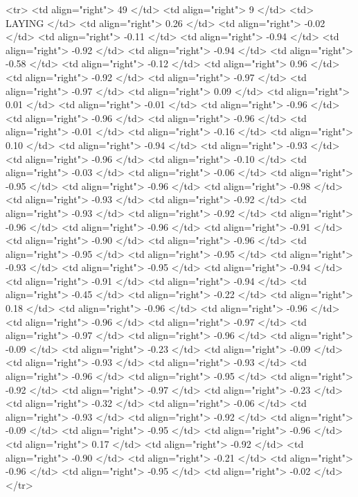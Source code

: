   <tr> <td align="right"> 49 </td> <td align="right">   9 </td> <td> LAYING </td> <td align="right"> 0.26 </td> <td align="right"> -0.02 </td> <td align="right"> -0.11 </td> <td align="right"> -0.94 </td> <td align="right"> -0.92 </td> <td align="right"> -0.94 </td> <td align="right"> -0.58 </td> <td align="right"> -0.12 </td> <td align="right"> 0.96 </td> <td align="right"> -0.92 </td> <td align="right"> -0.97 </td> <td align="right"> -0.97 </td> <td align="right"> 0.09 </td> <td align="right"> 0.01 </td> <td align="right"> -0.01 </td> <td align="right"> -0.96 </td> <td align="right"> -0.96 </td> <td align="right"> -0.96 </td> <td align="right"> -0.01 </td> <td align="right"> -0.16 </td> <td align="right"> 0.10 </td> <td align="right"> -0.94 </td> <td align="right"> -0.93 </td> <td align="right"> -0.96 </td> <td align="right"> -0.10 </td> <td align="right"> -0.03 </td> <td align="right"> -0.06 </td> <td align="right"> -0.95 </td> <td align="right"> -0.96 </td> <td align="right"> -0.98 </td> <td align="right"> -0.93 </td> <td align="right"> -0.92 </td> <td align="right"> -0.93 </td> <td align="right"> -0.92 </td> <td align="right"> -0.96 </td> <td align="right"> -0.96 </td> <td align="right"> -0.91 </td> <td align="right"> -0.90 </td> <td align="right"> -0.96 </td> <td align="right"> -0.95 </td> <td align="right"> -0.95 </td> <td align="right"> -0.93 </td> <td align="right"> -0.95 </td> <td align="right"> -0.94 </td> <td align="right"> -0.91 </td> <td align="right"> -0.94 </td> <td align="right"> -0.45 </td> <td align="right"> -0.22 </td> <td align="right"> 0.18 </td> <td align="right"> -0.96 </td> <td align="right"> -0.96 </td> <td align="right"> -0.96 </td> <td align="right"> -0.97 </td> <td align="right"> -0.97 </td> <td align="right"> -0.96 </td> <td align="right"> -0.09 </td> <td align="right"> -0.23 </td> <td align="right"> -0.09 </td> <td align="right"> -0.93 </td> <td align="right"> -0.93 </td> <td align="right"> -0.96 </td> <td align="right"> -0.95 </td> <td align="right"> -0.92 </td> <td align="right"> -0.97 </td> <td align="right"> -0.23 </td> <td align="right"> -0.32 </td> <td align="right"> -0.06 </td> <td align="right"> -0.93 </td> <td align="right"> -0.92 </td> <td align="right"> -0.09 </td> <td align="right"> -0.95 </td> <td align="right"> -0.96 </td> <td align="right"> 0.17 </td> <td align="right"> -0.92 </td> <td align="right"> -0.90 </td> <td align="right"> -0.21 </td> <td align="right"> -0.96 </td> <td align="right"> -0.95 </td> <td align="right"> -0.02 </td> </tr>
